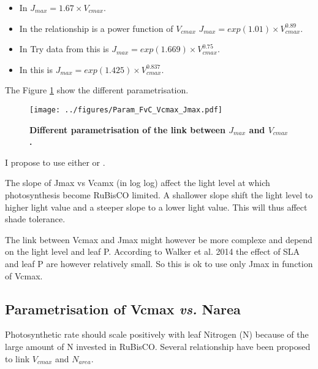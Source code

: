\documentclass[a4paper,11pt]{article}
\begin{document}
\begin{itemize}

\item In \citet{Medlyn-2002} $J_{max} = 1.67 \times  V_{cmax}$.

\item In \citet{Walker-2014} the relationship is a power function of $V_{cmax}$ $J_{max} = exp(1.01) \times V_{cmax}^{0.89}$.

\item In Try data from \citet{Kattge-2011} this is $J_{max} = exp(1.669) \times V_{cmax}^{0.75}$.

\item In \citet{Wullschleger-1993} this is $J_{max} = exp(1.425) \times V_{cmax}^{0.837}$.

\end{itemize}

The Figure \ref{fig:Vcmax_Jmax} show the different parametrisation.

\begin{figure}[ht]
\centering
\texttt{[image: ../figures/Param\_FvC\_Vcmax\_Jmax.pdf]}
\caption{\textbf{Different parametrisation of the link between $J_{max}$ and $V_{cmax}$.}
\label{fig:Vcmax_Jmax}}
\end{figure}

I propose to use either \citet{Medlyn-2002} or \citet{Walker-2014}.

The slope of Jmax vs Vcamx (in log log) affect the light level at which photosynthesis become RuBisCO limited. A shallower slope shift the light level to higher light value and a steeper slope to a lower light value. This will thus affect shade tolerance.

The link between Vcmax and Jmax might however be more complexe and depend on the light level and leaf P. According to Walker et al. 2014 the effect of SLA and leaf P are however relatively small. So this is ok to use only Jmax in function of Vcmax.

\subsection{Parametrisation of Vcmax \textit{vs.} Narea}

Photosynthetic rate should scale positively with leaf Nitrogen (N) because of the large amount of N invested in RuBisCO. Several relationship have been proposed to link $V_{cmax}$ and $N_{area}$.
\end{document}
